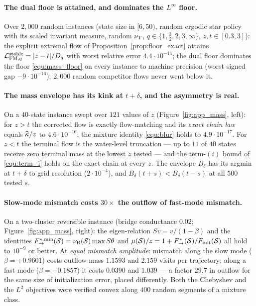 \paragraph{The dual floor is attained, and dominates the $L^\infty$ floor.}
Over $2{,}000$ random instances (state size in $[6,50)$, random ergodic star policy with
its scaled invariant measure, random $\nu_{\mathrm{T}}$, $q\in\{1,\frac32,2,3,\infty\}$,
$z,t\in[0.3,3]$): the explicit extremal flow of Proposition~\ref{prop:floor_exact} attains
$\mathcal L_{\mathrm{FM},q}^{\mathrm{stable}}=|z-t|/D_{q}$ with worst relative error $4.4\cdot10^{-14}$; the dual floor
dominates the floor \eqref{equ:mass_floor} on every instance to machine
precision (worst signed gap $-9\cdot10^{-16}$); $2{,}000$ random
competitor flows never went below it.

\paragraph{The mass envelope has its kink at $t+\delta$, and the asymmetry is real.}
On a $40$-state instance swept over $121$ values of $z$
(Figure~\ref{fig:app_mass}, left): for $z>t$ the corrected flow is exactly flow-matching
and its \emph{exact chain law} equals $\widehat{\kappa}/z$ to $4.6\cdot10^{-16}$; the
mixture identity \eqref{equ:blur} holds to $4.9\cdot10^{-17}$. For $z<t$ the terminal
flow is the water-level truncation --- up to $11$ of $40$ states receive zero terminal
mass at the lowest $z$ tested --- and the term-$(i)$ bound of \eqref{equ:term_i} holds on
the exact chain at every $z$. The envelope $B_\delta$ has its argmin at $t+\delta$ to
grid resolution ($2\cdot10^{-4}$), and $B_\delta(t+s)<B_\delta(t-s)$ at all $500$ tested
$s$.

\paragraph{Slow-mode mismatch costs $30\times$ the outflow of fast-mode mismatch.}
On a two-cluster reversible instance (bridge conductance $0.02$;
Figure~\ref{fig:app_mass}, right): the eigen-relation $Sv=v/(1-\beta)$ and the identities
$F^{*,\min}_{\rightarrow}(\mathcal S)=\nu_{\mathrm{B}}(\mathcal S)\max S\theta$ and
$\mu(\mathcal S)/z=1+F^*_{\rightarrow}(\mathcal S)/F_{\mathrm{init}}(\mathcal S)$ all hold to
$10^{-9}$ or better. At \emph{equal mismatch amplitude}: mismatch along the slow mode
($\beta=+0.9601$) costs outflow mass $1.1593$ and $2.159$ visits per trajectory; along a
fast mode ($\beta=-0.1857$) it costs $0.0390$ and $1.039$ --- a factor $29.7$ in outflow
for the same size of initialization error, placed differently. Both the Chebyshev and the
$L^2$ objectives were verified convex along $400$ random segments of a mixture class.

